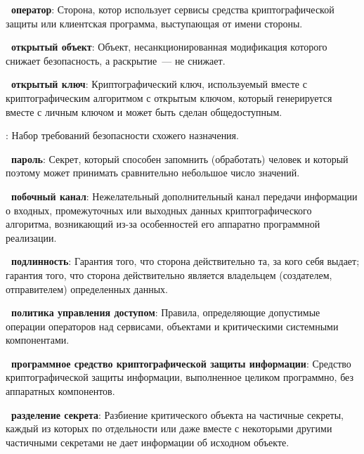 \begin{note}
\end{note}

{\bf \thedefctr~оператор}:
Сторона, котор использует сервисы средства криптографической 
защиты\addendum{,} или клиентская программа, выступающая от имени стороны.

{\bf \thedefctr~открытый объект}: 
Объект, несанкционированная модификация которого снижает безопасность, а
раскрытие~--- не снижает.

{\bf \thedefctr~открытый ключ}:
Криптографический ключ, используемый вместе с криптографическим алгоритмом с
открытым ключом, который генерируется вместе с личным ключом и может 
быть сделан общедоступным.


:
Набор требований безопасности схожего назначения.

{\bf \thedefctr~пароль}:
Секрет, который способен запомнить (обработать) человек и который
поэтому может принимать сравнительно небольшое число значений.

{\bf \thedefctr~побочный канал}:
Нежелательный дополнительный канал передачи информации о 
входных, промежуточных или выходных данных криптографического алгоритма,  
возникающий из-за особенностей его аппаратно программной 
реализации. 

{\bf \thedefctr~подлинность}:
Гарантия того, что сторона действительно та, за кого себя выдает; гарантия того,
что сторона действительно является владельцем (создателем, отправителем)
определенных данных.

{\bf \thedefctr~политика управления доступом}:
Правила, определяющие допустимые операции операторов над сервисами, объектами и
критическими системными компонентами.

{\bf \thedefctr~программное средство криптографической защиты информации}:
Средство криптографической защиты информации, выполненное целиком программно, 
без аппаратных компонентов. 

{\bf \thedefctr~разделение секрета}:
Разбиение критического объекта на частичные секреты, 
каждый из которых по отдельности или даже вместе с некоторыми
другими частичными секретами не дает информации об исходном объекте.

